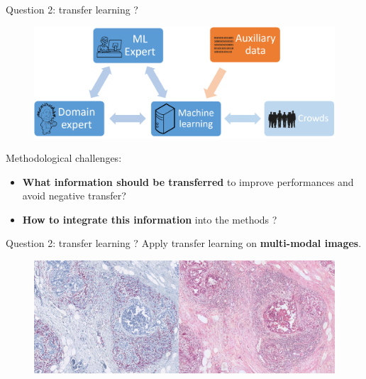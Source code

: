 \documentclass{beamer}
\begin{document}
\begin{frame}{Question 2: transfer learning ?}
	
	\begin{figure}
		\includegraphics[scale=0.25]{images/with_expert_and_crowd_and_aux.png}
	\end{figure}
	
	\hfill
	
	Methodological challenges:
	\begin{itemize}
		\item \textbf{What information should be transferred} to improve performances and avoid negative transfer? 
		\item \textbf{How to integrate this information} into the methods ? 
	\end{itemize}
	
\end{frame}

\begin{frame}{Question 2: transfer learning ?}	
	Apply transfer learning on \textbf{multi-modal images}.

	\begin{figure}
		\center
		\includegraphics[scale=0.14]{images/multimodal.png}
	\end{figure}	
\end{frame}
\end{document}
